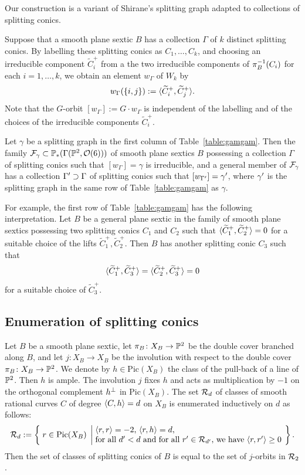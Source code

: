 \documentclass{amsart} %
\newcommand{\ps}{B}
\newcommand{\con}{C}
\newcommand{\wtcon}{\widetilde{\con}}
\newcommand{\pips}{\pi_{\ps}}
\newcommand{\Xps}{X_{\ps}}
\newcommand{\col}{\Gamma }
\newcommand{\gra}{w}
\newcommand{\Pic}{\mathrm{Pic}}
\begin{document}
%
\begin{remark}
Our construction is a  variant of Shirane's
splitting graph adapted to collections of splitting conics.
\end{remark}
%
Suppose that a smooth plane sextic $\ps$ has 
a collection $\col$ of $k$ distinct  splitting conics.
By  labelling  these splitting conics
as $\con_1, \dots, \con_k$,
and choosing an irreducible component 
$\wtcon_i^+$ from a the two irreducible components of 
 $\pips\inv (\con_i)$ for each $i=1, \dots, k$,
we obtain an element $\gra_{\col}$  of $W_k$  by 
\[
\gra_{\col}(\{i, j\}):=\intf{\wtcon_i^+, \wtcon_j^+}.
\]
Note that the $G$-orbit
$[\gra_{\col}]:=G\cdot \gra_{\col}$ 
is independent of the labelling and of the choices of the irreducible components
 $\wtcon_i^+$.
%
\begin{theorem}
Let $\gamma$ be a splitting graph in the first column of Table~\ref{table:gamgam}.
Then the family $\mathord{\mathcal{F}}_{\gamma}\subset \mathord{\mathbb{P}}_*(\Gamma(\mathord{\mathbb{P}}^2, \mathord{\mathcal{O}}(6)))$ of smooth plane sextics $\ps$ possessing a collection $\col$ 
of splitting conics such that $[\gra_{\col}]=\gamma$
is irreducible,
and a general member of $\mathord{\mathcal{F}}_{\gamma}$ 
has a collection $\col\sprime\supset \col$ 
of splitting conics such that $[\gra_{\col\sprime}]=\gamma\sprime$,
where $\gamma^{\prime}$ is the splitting graph 
in the same row of Table~\ref{table:gamgam} as $\gamma$.
\end{theorem}
%
For example, the first row of Table~\ref{table:gamgam} has the following interpretation.
Let  $\ps$ be a general plane sextic 
in the family of smooth plane sextics possessing 
two splitting conics $\con_1$ and $\con_2$
such that $\intf{\wtcon_1^+, \wtcon_2^+}=0$  for a suitable choice of the lifts 
$\wtcon_1^+, \wtcon_2^+$.
Then  $\ps$ has another  splitting conic $\con_3$ such that 
\[
\intf{\wtcon_1^+, \wtcon_3^+}=\intf{\wtcon_2^+, \wtcon_3^+}=0
\]
for a suitable choice of $\wtcon_3^+$.
%
\subsection{Enumeration of splitting conics}\label{subsec:enum}
%
Let $\ps$ be a smooth plane sextic,
 let $\pips\colon \Xps\to \PP^2$ be the double cover branched along $\ps$,
 and let $j\colon X_{\ps}\to X_{\ps}$ be the involution 
 with respect to the double cover $\pips\colon \Xps\to \PP^2$.
We denote by  $h\in  \Pic(\Xps)$   the class  of the pull-back of a line of $\mathord{\mathbb{P}}^2$.
Then $h$ is ample.
The involution $j$
fixes $h$ and acts as multiplication by $-1$
on the orthogonal complement $h^{\perp}$ in $ \Pic(\Xps)$.
The set $\mathord{\mathcal{R}}_d$ of classes of smooth rational curves $C$ of 
degree $\langle C, h \rangle=d$ on $X_{\ps}$ 
is  enumerated 
inductively on $d$ as follows:
\[
\RRR_d:=\bigset{r\in \Pic(X_{\ps})}
{\parbox{8cm}{$\intf{r, r}=-2$, $\intf{r, h}=d$, \\
for all $d\sprime<d$ and for all $r\sprime\in \RRR_{d\sprime}$, we have 
$\intf{r, r\sprime}\ge 0$}
}.
\]
Then the set of classes of splitting conics of $\ps$ is equal to 
the set of $j$-orbits in $\mathord{\mathcal{R}}_2$.
%
\end{document}
